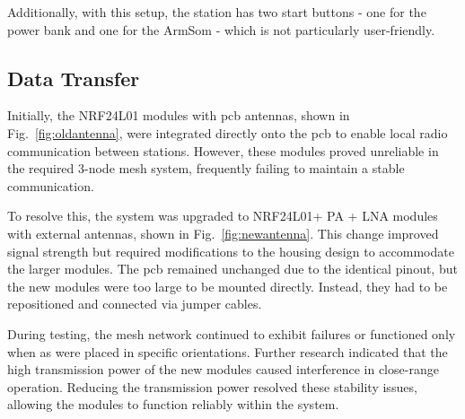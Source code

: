 Additionally, with this setup, the station has two start buttons - one for the power bank and one for the ArmSom - which is not particularly user-friendly.

\subsection{Data Transfer}

Initially, the NRF24L01 \cite{nRF24L01} modules with \acrshort{pcb} antennas, shown in Fig.~\ref{fig:oldantenna}, were integrated directly onto the \acrshort{pcb} to enable local radio communication between stations. However, these modules proved unreliable in the required 3-node mesh system, frequently failing to maintain a stable communication.

To resolve this, the system was upgraded to NRF24L01+ PA + LNA \cite{nRF24L01_plus} modules with external antennas, shown in Fig.~\ref{fig:newantenna}. This change improved signal strength but required modifications to the housing design to accommodate the larger modules. The \acrshort{pcb} remained unchanged due to the identical pinout, but the new modules were too large to be mounted directly. Instead, they had to be repositioned and connected via jumper cables.

During testing, the mesh network continued to exhibit failures or functioned only when as were placed in specific orientations. Further research indicated that the high transmission power of the new modules caused interference in close-range operation. Reducing the transmission power resolved these stability issues, allowing the modules to function reliably within the system.

